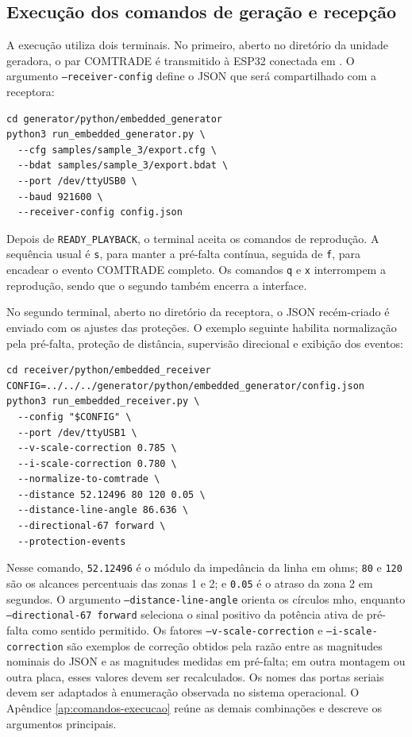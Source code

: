 \subsection{Execução dos comandos de geração e recepção}

A execução utiliza dois terminais. No primeiro, aberto no diretório da unidade geradora, o par COMTRADE é transmitido à ESP32 conectada em . O argumento \texttt{--receiver-config} define o JSON que será compartilhado com a receptora:

\begin{verbatim}
cd generator/python/embedded_generator
python3 run_embedded_generator.py \
  --cfg samples/sample_3/export.cfg \
  --bdat samples/sample_3/export.bdat \
  --port /dev/ttyUSB0 \
  --baud 921600 \
  --receiver-config config.json
\end{verbatim}

Depois de \texttt{READY\_PLAYBACK}, o terminal aceita os comandos de reprodução. A sequência usual é \texttt{s}, para manter a pré-falta contínua, seguida de \texttt{f}, para encadear o evento COMTRADE completo. Os comandos \texttt{q} e \texttt{x} interrompem a reprodução, sendo que o segundo também encerra a interface.

No segundo terminal, aberto no diretório da receptora, o JSON recém-criado é enviado com os ajustes das proteções. O exemplo seguinte habilita normalização pela pré-falta, proteção de distância, supervisão direcional e exibição dos eventos:

\begin{verbatim}
cd receiver/python/embedded_receiver
CONFIG=../../../generator/python/embedded_generator/config.json
python3 run_embedded_receiver.py \
  --config "$CONFIG" \
  --port /dev/ttyUSB1 \
  --v-scale-correction 0.785 \
  --i-scale-correction 0.780 \
  --normalize-to-comtrade \
  --distance 52.12496 80 120 0.05 \
  --distance-line-angle 86.636 \
  --directional-67 forward \
  --protection-events
\end{verbatim}

Nesse comando, \texttt{52.12496} é o módulo da impedância da linha em ohms; \texttt{80} e \texttt{120} são os alcances percentuais das zonas 1 e 2; e \texttt{0.05} é o atraso da zona 2 em segundos. O argumento \texttt{--distance-line-angle} orienta os círculos mho, enquanto \texttt{--directional-67 forward} seleciona o sinal positivo da potência ativa de pré-falta como sentido permitido. Os fatores \texttt{--v-scale-correction} e \texttt{--i-scale-correction} são exemplos de correção obtidos pela razão entre as magnitudes nominais do JSON e as magnitudes medidas em pré-falta; em outra montagem ou outra placa, esses valores devem ser recalculados. Os nomes das portas seriais devem ser adaptados à enumeração observada no sistema operacional. O Apêndice \ref{ap:comandos-execucao} reúne as demais combinações e descreve os argumentos principais.


